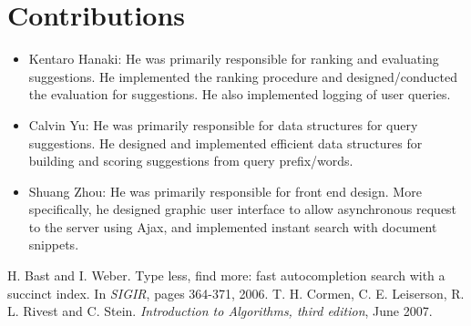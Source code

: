 \documentclass{article}
\begin{document}
\section{Contributions}

\begin{itemize}
\item Kentaro Hanaki: He was primarily responsible for ranking and evaluating suggestions. He implemented the ranking procedure and designed/conducted the evaluation for suggestions. He also implemented logging of user queries.
\item Calvin Yu: He was primarily responsible for data structures for query suggestions. He designed and implemented efficient data structures for building and scoring suggestions from query prefix/words.
\item Shuang Zhou: He was primarily responsible for front end design. More specifically, he designed graphic user interface to allow asynchronous request to the server using Ajax, and implemented instant search with document snippets.
\end{itemize}


\begin{thebibliography}{1}

 H. Bast and I. Weber. Type less, find more: fast autocompletion search with a succinct index. In {\em SIGIR}, pages 364-371, 2006.
 T. H. Cormen, C. E. Leiserson, R. L. Rivest and C. Stein. {\em Introduction to Algorithms, third edition}, June 2007.

\end{thebibliography}
\end{document}
